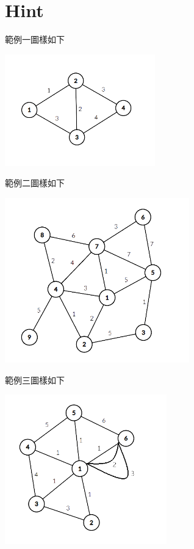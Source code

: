 \documentclass[11pt,a4paper]{article}
\begin{document}
\newpage
\section*{Hint}
範例一圖樣如下
\begin{center}
	\includegraphics[width=6.5cm]{sample1.png}
\end{center}

範例二圖樣如下
\begin{center}
	\includegraphics[width=8cm]{sample2.png}
\end{center}

範例三圖樣如下
\begin{center}
	\includegraphics[width=7cm]{sample3.png}
\end{center}
\end{document}
